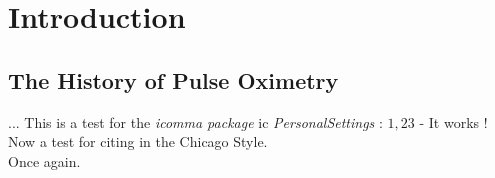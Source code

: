 %

\chapter{Introduction}
\label{Ch:Introduction}
\section{The History of Pulse Oximetry}

...
This is a test for the \textit{icomma package} ic \textit{PersonalSettings} :  $1,23$ -  It works !\\

Now a test for citing in the Chicago Style.\cite{zappe2010}\\
Once again. \cite{mueller2010}



